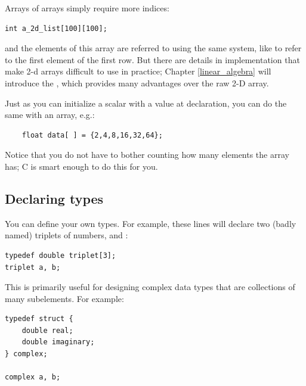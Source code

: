 Arrays of arrays simply require more indices:\\
\begin{lstlisting}
int a_2d_list[100][100];
\end{lstlisting}
and the elements of this array are referred to using the same system,
like 
 to refer to the first element of the first row.
But there are details in implementation that make 2-d arrays difficult
to use in practice; Chapter \ref{linear_algebra} will introduce
the , which provides many advantages over the raw
2-D array.

Just as you can initialize a scalar with a value at declaration, you can
do the same with an array, e.g.:
\begin{lstlisting}
    float data[ ] = {2,4,8,16,32,64};
\end{lstlisting}
Notice that you do not have to bother counting how many elements the
array has; C is smart enough to do this for you.



\subsection{Declaring types}  
You can define your own
types. For example, these lines will declare two (badly named) triplets
of numbers,  and :

\begin{lstlisting}
typedef double triplet[3];
triplet	a, b;
\end{lstlisting}

This is primarily useful for designing
complex data types that are collections of many subelements. 
For example:

\begin{lstlisting}
typedef struct {
    double real;
    double imaginary;
} complex;

complex a, b;
\end{lstlisting}

